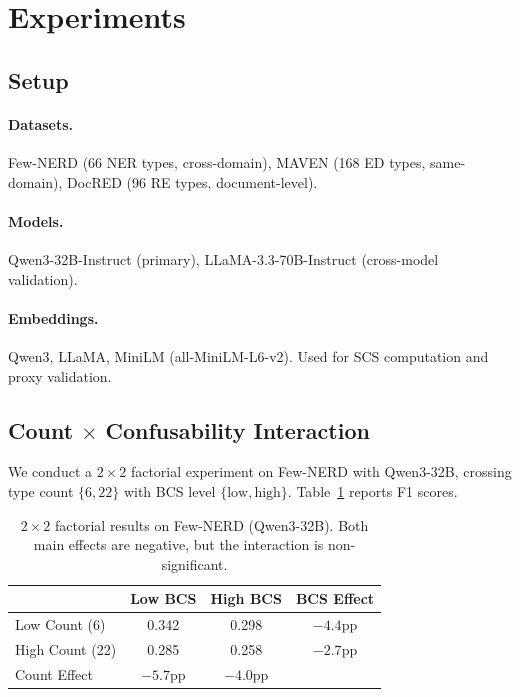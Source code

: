 \documentclass[11pt,a4paper]{article}
\begin{document}
\section{Experiments}
\label{sec:experiments}

\subsection{Setup}

\paragraph{Datasets.} Few-NERD (66 NER types, cross-domain), MAVEN (168 ED types, same-domain), DocRED (96 RE types, document-level).

\paragraph{Models.} Qwen3-32B-Instruct (primary), LLaMA-3.3-70B-Instruct (cross-model validation).

\paragraph{Embeddings.} Qwen3, LLaMA, MiniLM (all-MiniLM-L6-v2). Used for SCS computation and proxy validation.

\subsection{Count $\times$ Confusability Interaction}
\label{sec:interaction}

We conduct a $2{\times}2$ factorial experiment on Few-NERD with Qwen3-32B, crossing type count $\{6, 22\}$ with BCS level $\{\text{low}, \text{high}\}$. Table~\ref{tab:factorial} reports F1 scores.

\begin{table}[t]
\centering
\small
\begin{tabular}{lccc}
\toprule
& Low BCS & High BCS & BCS Effect \\
\midrule
Low Count (6) & 0.342 & 0.298 & $-4.4$pp \\
High Count (22) & 0.285 & 0.258 & $-2.7$pp \\
\midrule
Count Effect & $-5.7$pp & $-4.0$pp & \\
\bottomrule
\end{tabular}
\caption{$2{\times}2$ factorial results on Few-NERD (Qwen3-32B). Both main effects are negative, but the interaction is non-significant.}
\label{tab:factorial}
\end{table}
\end{document}
